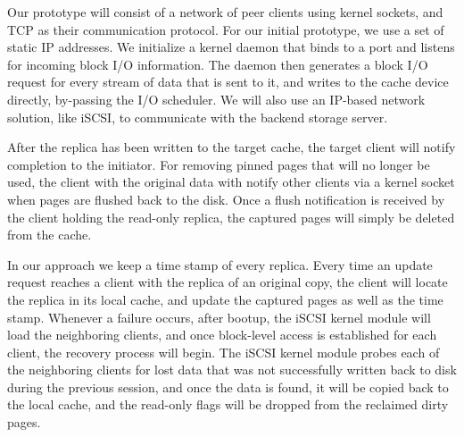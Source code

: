 Our prototype will consist of a network of peer
clients using kernel sockets, and TCP as their communication
protocol. For our initial prototype, we use a set of static
IP addresses. We initialize a kernel daemon that binds to a
port and listens for incoming block I/O information. The
daemon then generates a block I/O request for every stream
of data that is sent to it, and writes to the cache device
directly, by-passing the I/O scheduler. We will also use an
IP-based network solution, like iSCSI, to communicate with
the backend storage server.

After the replica has been written to the target cache,
the target client will notify completion to the initiator.
For removing pinned pages that will no longer be used, the
client with the original data with notify other clients
via a kernel socket when pages are flushed back to the disk.
Once a flush notification is received by the client holding
the read-only replica, the captured pages will simply be
deleted from the cache. 



In our approach we keep a time stamp of every replica. Every time an update request
reaches a client with the replica of an original copy, the client will locate the
replica in its local cache, and update the captured pages as well as the time stamp.
Whenever a failure occurs, after bootup, the iSCSI kernel module will load the neighboring
clients, and once block-level access is established for each client, the recovery process
will begin. The iSCSI kernel module probes each of the neighboring clients for lost data
that was not successfully written back to disk during the previous session, and once the
data is found, it will be copied back to the local cache, and the read-only flags will be
dropped from the reclaimed dirty pages.

\label{approach}
